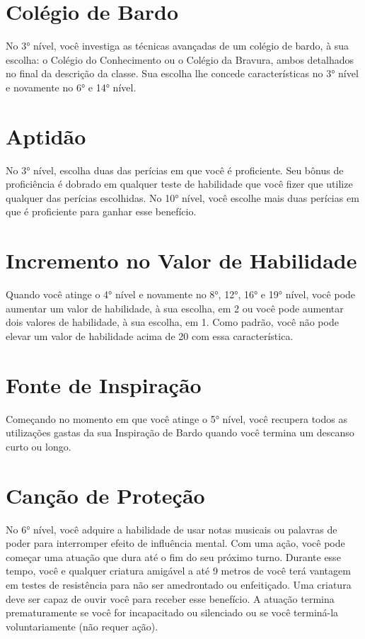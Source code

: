 \documentclass{RPG_Adventure}[2021/10/20]
\begin{document}
\section*{Colégio de Bardo}%
\label{sec:colegio_de_bardo}

No 3° nível, você investiga as técnicas avançadas de um colégio de bardo, à sua
escolha: o Colégio do Conhecimento ou o Colégio da Bravura, ambos detalhados no
final da descrição da classe. Sua escolha lhe concede características no 3°
nível e novamente no 6° e 14° nível.

\section*{Aptidão}%
\label{sec:aptidao}

No 3° nível, escolha duas das perícias em que você é proficiente. Seu bônus de
proficiência é dobrado em qualquer teste de habilidade que você fizer que
utilize qualquer das perícias escolhidas.
No 10° nível, você escolhe mais duas perícias em que é proficiente para ganhar
esse benefício.

\section*{Incremento no Valor de Habilidade}%
\label{sec:incremento_no_valor_de_habilidade}

Quando você atinge o 4° nível e novamente no 8°, 12°, 16° e 19° nível, você pode
aumentar um valor de habilidade, à sua escolha, em 2 ou você pode aumentar dois
valores de habilidade, à sua escolha, em 1. Como padrão, você não pode elevar um
valor de habilidade acima de 20 com essa característica.

\section*{Fonte de Inspiração}%
\label{sec:fonte_de_inspiracao}

Começando no momento em que você atinge o 5° nível, você recupera todos as
utilizações gastas da sua Inspiração de Bardo quando você termina um descanso
curto ou longo.

\section*{Canção de Proteção}%
\label{sec:cancao_de_protecao}

No 6° nível, você adquire a habilidade de usar notas musicais ou palavras de
poder para interromper efeito de influência mental. Com uma ação, você pode
começar uma atuação que dura até o fim do seu próximo turno. Durante esse tempo,
você e qualquer criatura amigável a até 9 metros de você terá vantagem em testes
de resistência para não ser amedrontado ou enfeitiçado. Uma criatura deve ser
capaz de ouvir você para receber esse benefício.
A atuação termina prematuramente se você for incapacitado ou silenciado ou se
você terminá-la voluntariamente (não requer ação).
\end{document}
